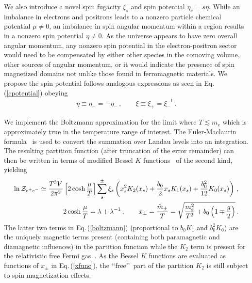 \documentclass[a4paper]{article}
\newcommand{\req}[1]{Eq.\,(\ref{#1})}
\begin{document}
We also introduce a novel spin fugacity $\xi_{s}$ and spin potential $\eta_{s}=s\eta$. While an imbalance in electrons and positrons leads to a nonzero particle chemical potential $\mu\neq0$, an imbalance in spin angular momentum within a region results in a nonzero spin potential $\eta\neq0$. As the universe appears to have zero overall angular momentum, any nonzero spin potential in the electron-positron sector would need to be compensated by either other species in the comoving volume, other sources of angular momentum, or it would indicate the presence of spin magnetized domains not unlike those found in ferromagnetic materials. We propose the spin potential follows analogous expressions as seen in \req{cpotential} obeying
\begin{align}
    \label{spotential}
    \eta\equiv\eta_{+}=-\eta_{-}\,,\qquad
    \xi\equiv\xi_{+}=\xi_{-}^{-1}\,.
\end{align}

We implement the Boltzmann approximation for the limit where $T\lesssim m_e$ which is approximately true in the temperature range of interest. The Euler-Maclaurin formula~\cite{abramowitz1988handbook} is used to convert the summation over Landau levels into an integration. The resulting partition function (after truncation of the error remainder) can then be written in terms of modified Bessel $K$ functions~\cite{abramowitz1988handbook,letessier2002hadrons} of the second kind, yielding
\begin{align}
    \label{boltzmann}
    \ln{\cal Z}_{e^{+}e^{-}}\simeq\frac{T^{3}V}{2\pi^{2}}\left[2\cosh{\frac{\mu}{T}}\right]\sum_{s}^{\pm}\xi_{s}\left(x_{s}^{2}K_{2}(x_{s})+\frac{b_{0}}{2}x_{s}K_{1}(x_{s})+\frac{b_{0}^{2}}{12}K_{0}(x_{s})\right)\,,\\
    \label{xfunc}
    2\cosh{\frac{\mu}{T}}=\lambda+\lambda^{-1}\,,\qquad
    x_{\pm}=\frac{{\tilde m}_{\pm}}{T}=\sqrt{\frac{m_{e}^{2}}{T^{2}}+b_{0}\left(1\mp\frac{g}{2}\right)}\,.
\end{align}
The latter two terms in \req{boltzmann} (proportional to $b_{0}K_{1}$ and $b_{0}^{2}K_{0}$) are the uniquely magnetic terms present (containing both paramagnetic and diamagnetic influences) in the partition function while the $K_{2}$ term is present for the relativistic free Fermi gas~\cite{greiner2012thermodynamics}. As the Bessel $K$ functions are evaluated as functions of $x_{\pm}$ in \req{xfunc}, the \lq\lq free\rq\rq\ part of the partition $K_{2}$ is still subject to spin magnetization effects.
\end{document}
